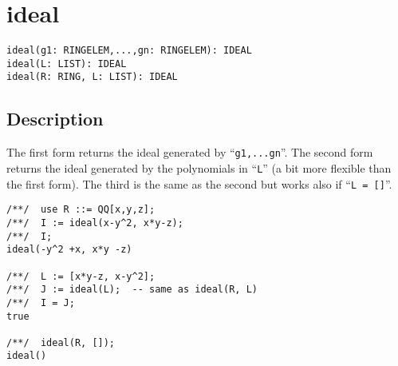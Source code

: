 \documentclass[a4paper]{mybook}
\newenvironment{command}{}{} %
\begin{document}
\section{ideal}
\label{ideal}
\begin{command} %


\begin{Verbatim}[label=syntax, rulecolor=\color{MidnightBlue},
frame=single]
ideal(g1: RINGELEM,...,gn: RINGELEM): IDEAL
ideal(L: LIST): IDEAL
ideal(R: RING, L: LIST): IDEAL
\end{Verbatim}


\subsection*{Description}

The first form returns the ideal generated by ``\verb&g1,...gn&''.
The second form returns the ideal generated by the polynomials in ``\verb&L&''
(a bit more flexible than the first form).
The third is the same as the second but works also if ``\verb&L = []&''.
\begin{Verbatim}[label=example, rulecolor=\color{PineGreen}, frame=single]
/**/  use R ::= QQ[x,y,z];
/**/  I := ideal(x-y^2, x*y-z);
/**/  I;
ideal(-y^2 +x, x*y -z)

/**/  L := [x*y-z, x-y^2];
/**/  J := ideal(L);  -- same as ideal(R, L)
/**/  I = J;
true

/**/  ideal(R, []);
ideal()
\end{Verbatim}


\end{command} %
\end{document}
